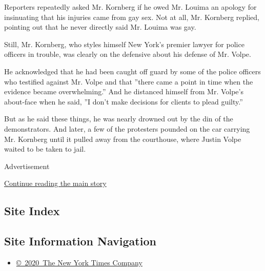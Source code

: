 Reporters repeatedly asked Mr. Kornberg if he owed Mr. Louima an apology
for insinuating that his injuries came from gay sex. Not at all, Mr.
Kornberg replied, pointing out that he never directly said Mr. Louima
was gay.

Still, Mr. Kornberg, who styles himself New York's premier lawyer for
police officers in trouble, was clearly on the defensive about his
defense of Mr. Volpe.

He acknowledged that he had been caught off guard by some of the police
officers who testified against Mr. Volpe and that ''there came a point
in time when the evidence became overwhelming.'' And he distanced
himself from Mr. Volpe's about-face when he said, ''I don't make
decisions for clients to plead guilty.''

But as he said these things, he was nearly drowned out by the din of the
demonstrators. And later, a few of the protesters pounded on the car
carrying Mr. Kornberg until it pulled away from the courthouse, where
Justin Volpe waited to be taken to jail.

Advertisement

\protect\hyperlink{after-bottom}{Continue reading the main story}

\hypertarget{site-index}{%
\subsection{Site Index}\label{site-index}}

\hypertarget{site-information-navigation}{%
\subsection{Site Information
Navigation}\label{site-information-navigation}}

\begin{itemize}
\tightlist
\item
  \href{https://help.nytimes3xbfgragh.onion/hc/en-us/articles/115014792127-Copyright-notice}{©~2020~The
  New York Times Company}
\end{itemize}

